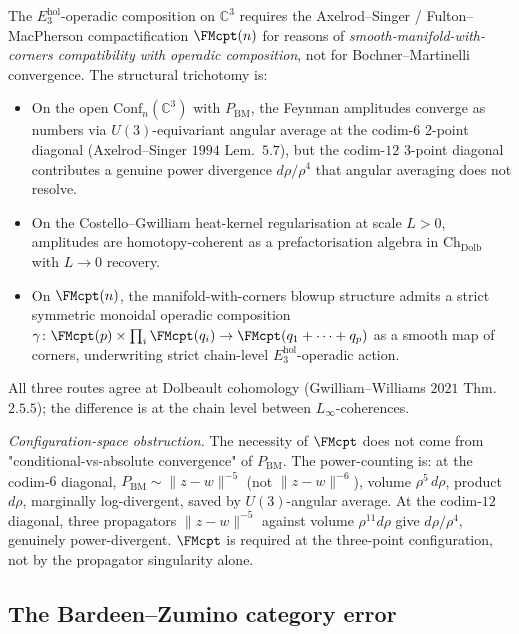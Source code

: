 \begin{theorem}
\label{wn:thm:second-pass-FM-reason}

The $E_3^{\mathrm{hol}}$-operadic composition on $\mathbb{C}^3$
requires the Axelrod--Singer / Fulton--MacPherson compactification
$\FMcpt(n)$ for reasons of \emph{smooth-manifold-with-corners
compatibility with operadic composition}, not for Bochner--Martinelli
convergence. The structural trichotomy is:
\begin{itemize}
\item On the open $\mathrm{Conf}_n(\mathbb{C}^3)$ with
$P_{\mathrm{BM}}$, the Feynman amplitudes converge as numbers via
$U(3)$-equivariant angular average at the codim-$6$ 2-point diagonal
(Axelrod--Singer $1994$ Lem.~$5.7$), but the codim-$12$ 3-point
diagonal contributes a genuine power divergence
$d\rho/\rho^{4}$ that angular averaging does not resolve.
\item On the Costello--Gwilliam heat-kernel regularisation at scale
$L > 0$, amplitudes are homotopy-coherent as a prefactorisation algebra
in $\mathrm{Ch}_{\mathrm{Dolb}}$ with $L \to 0$ recovery.
\item On $\FMcpt(n)$, the manifold-with-corners blowup structure
admits a strict symmetric monoidal operadic composition
$\gamma\colon \FMcpt(p) \times \prod_i \FMcpt(q_i) \to \FMcpt(q_1 +
\cdots + q_p)$ as a smooth map of corners, underwriting strict
chain-level $E_3^{\mathrm{hol}}$-operadic action.
\end{itemize}
All three routes agree at Dolbeault cohomology
(Gwilliam--Williams $2021$ Thm.~$2.5.5$); the difference is at the
chain level between $L_\infty$-coherences.

\emph{Configuration-space obstruction.} The necessity of $\FMcpt$ does
not come from "conditional-vs-absolute convergence" of
$P_{\mathrm{BM}}$. The power-counting is: at the
codim-$6$ diagonal, $P_{\mathrm{BM}} \sim \|z - w\|^{-5}$ (not
$\|z - w\|^{-6}$), volume $\rho^{5}\, d\rho$, product $d\rho$,
marginally log-divergent, saved by $U(3)$-angular average. At the
codim-$12$ diagonal, three propagators $\|z - w\|^{-5}$ against volume
$\rho^{11} d\rho$ give $d\rho/\rho^{4}$, genuinely power-divergent.
$\FMcpt$ is required at the three-point configuration, not by the
propagator singularity alone.
\end{theorem}

\subsection{The Bardeen--Zumino category error}
\label{wn:subsec:second-pass-BZ}

